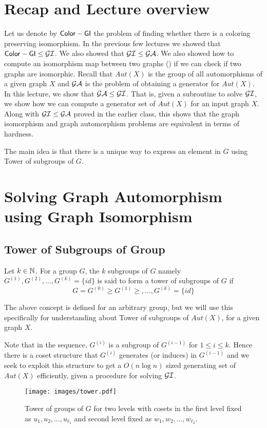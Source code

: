 
\section{Recap and Lecture overview}
Let us denote by ${\sf Color-GI}$ the problem of finding whether there is a coloring
preserving isomorphism.  In the previous few lectures we showed that ${\sf Color-GI} \le
\mathcal{GI}$. We also showed that $\mathcal{GI} \le \mathcal{GA}$. We also showed how to compute an
isomorphism map between two graphs (\compiso) if we can check if two graphs are
isomorphic. Recall that $Aut(X)$ is the group of all automorphisms of a given
graph $X$ and $\mathcal{GA}$ is the problem of obtaining a generator for $Aut(X)$.  
In this lecture, we show that $\mathcal{GA} \le \mathcal{GI}$. That is, given a
subroutine to solve $\mathcal{GI}$, we show how we can compute a generator set of
$Aut(X)$ for an input graph $X$. Along with
$\mathcal{GI} \le \mathcal{GA}$ proved in the earlier class, this shows that the graph
isomorphism and graph automorphism problems are equivalent in terms of
hardness.

The main idea is that there is a unique way to express an element in
$G$ using Tower of subgroups of $G$.

\section{Solving Graph Automorphism using Graph Isomorphism}

\subsection{Tower of Subgroups of Group}
\begin{definition}
	Let $k \in \mathbb{N}$. For a group $G$, the $k$ subgroups of $G$ namely
	$G^{(1)}, G^{(2)}, \ldots,  G^{(k)} = \{id\}$ is said to form a tower
	of subgroups of $G$ if \[ G = G^{(0)} \ge G^{(1)} \ge ,\ldots ,
	G^{(k)} = \{id\} \] 
\end{definition}
The above concept is defined for an arbitrary group, but we will use this
specifically for understanding about Tower of subgroups of $Aut(X)$, for a
given graph $X$.

Note that in the sequence, $G^{(i)}$ is a subgroup of $G^{(i-1)}$ for $ 1 \le i
\le k$. Hence there is a coset structure that $G^{(i)}$ generates (or induces) 
in $G^{(i-1)}$ and we seek to exploit this structure to get a $O(n\log n)$
sized generating set of $Aut(X)$ efficiently, given a procedure for solving 
$\mathcal{GI}$. 
\begin{figure}[htp!]
	\centering
	\texttt{[image: images/tower.pdf]}
	\caption{Tower of groups of $G$ for two levels with cosets in the
		first level fixed as $u_1,u_2,\ldots, u_{\ell_1}$ and second
		level fixed as $w_1,w_2,\ldots,w_{\ell_2}$.}
	\label{fig:tower}
\end{figure}

